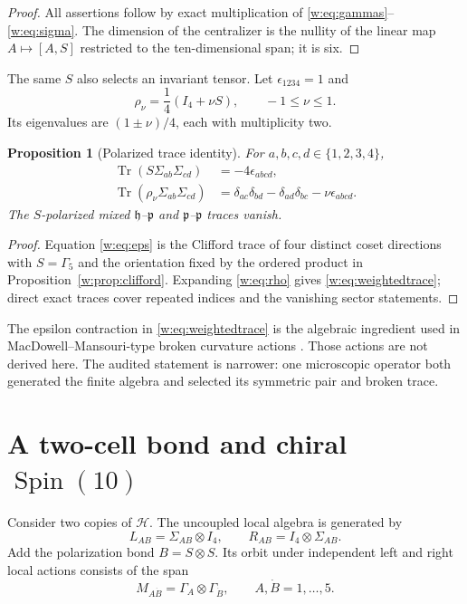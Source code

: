 \documentclass[11pt]{article}
\newtheorem{proposition}[theorem]{Proposition}
\theoremstyle{remark}\newtheorem{remark}[theorem]{Remark}
\begin{document}
\begin{proof}
All assertions follow by exact multiplication of \eqref{w:eq:gammas}--\eqref{w:eq:sigma}.  The dimension of the centralizer is the nullity of the linear map $A\mapsto[A,S]$ restricted to the ten-dimensional span; it is six.
\end{proof}

The same $S$ also selects an invariant tensor.  Let $\epsilon_{1234}=1$ and
\begin{equation}
\rho_\nu=\frac14(I_4+\nu S),\qquad -1\leq\nu\leq1.
\label{w:eq:rho}
\end{equation}
Its eigenvalues are $(1\pm\nu)/4$, each with multiplicity two.

\begin{proposition}[Polarized trace identity]\label{w:prop:trace}
For $a,b,c,d\in\{1,2,3,4\}$,
\begin{align}
\operatorname{Tr}(S\Sigma_{ab}\Sigma_{cd})&=-4\epsilon_{abcd},\label{w:eq:eps}\\
\operatorname{Tr}(\rho_\nu\Sigma_{ab}\Sigma_{cd})
&=\delta_{ac}\delta_{bd}-\delta_{ad}\delta_{bc}-\nu\epsilon_{abcd}.
\label{w:eq:weightedtrace}
\end{align}
The $S$-polarized mixed $\mathfrak h$--$\mathfrak p$ and $\mathfrak p$--$\mathfrak p$ traces vanish.
\end{proposition}

\begin{proof}
Equation \eqref{w:eq:eps} is the Clifford trace of four distinct coset directions with $S=\Gamma_5$ and the orientation fixed by the ordered product in Proposition~\ref{w:prop:clifford}.  Expanding \eqref{w:eq:rho} gives \eqref{w:eq:weightedtrace}; direct exact traces cover repeated indices and the vanishing sector statements.
\end{proof}

The epsilon contraction in \eqref{w:eq:weightedtrace} is the algebraic ingredient used in MacDowell--Mansouri-type broken curvature actions \cite{MacDowell1977,Wise2010}.  Those actions are not derived here.  The audited statement is narrower: one microscopic operator both generated the finite algebra and selected its symmetric pair and broken trace.

\section{A two-cell bond and chiral \texorpdfstring{$\operatorname{Spin}(10)$}{Spin(10)}}

Consider two copies of $\mathcal H$.  The uncoupled local algebra is generated by
\begin{equation}
L_{AB}=\Sigma_{AB}\otimes I_4,\qquad
R_{AB}=I_4\otimes\Sigma_{AB}.
\end{equation}
Add the polarization bond $B=S\otimes S$.  Its orbit under independent left and right local actions consists of the span
\begin{equation}
M_{A\dot B}=\Gamma_A\otimes\Gamma_{\dot B},\qquad A,\dot B=1,\ldots,5.
\end{equation}
\end{document}
